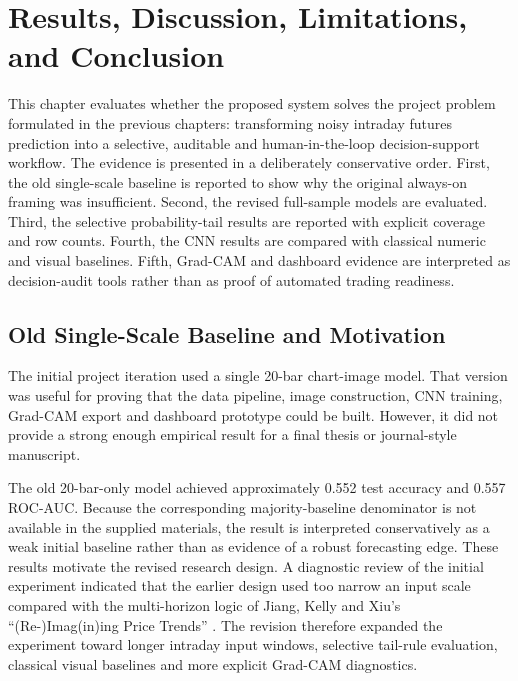 
\section{Results, Discussion, Limitations, and Conclusion}
\label{sec:results_discussion}

This chapter evaluates whether the proposed system solves the project problem formulated in the previous chapters: transforming noisy intraday futures prediction into a selective, auditable and human-in-the-loop decision-support workflow. The evidence is presented in a deliberately conservative order. First, the old single-scale baseline is reported to show why the original always-on framing was insufficient. Second, the revised full-sample models are evaluated. Third, the selective probability-tail results are reported with explicit coverage and row counts. Fourth, the CNN results are compared with classical numeric and visual baselines. Fifth, Grad-CAM and dashboard evidence are interpreted as decision-audit tools rather than as proof of automated trading readiness.

\subsection{Old Single-Scale Baseline and Motivation}
\label{subsec:old_baseline}

The initial project iteration used a single 20-bar chart-image model. That version was useful for proving that the data pipeline, image construction, CNN training, Grad-CAM export and dashboard prototype could be built. However, it did not provide a strong enough empirical result for a final thesis or journal-style manuscript.

The old 20-bar-only model achieved approximately 0.552 test accuracy and 0.557 ROC-AUC. Because the corresponding majority-baseline denominator is not available in the supplied materials, the result is interpreted conservatively as a weak initial baseline rather than as evidence of a robust forecasting edge. These results motivate the revised research design. A diagnostic review of the initial experiment indicated that the earlier design used too narrow an input scale compared with the multi-horizon logic of Jiang, Kelly and Xiu's ``(Re-)Imag(in)ing Price Trends'' \cite{jiang_reimagining_price_trends}. The revision therefore expanded the experiment toward longer intraday input windows, selective tail-rule evaluation, classical visual baselines and more explicit Grad-CAM diagnostics.

